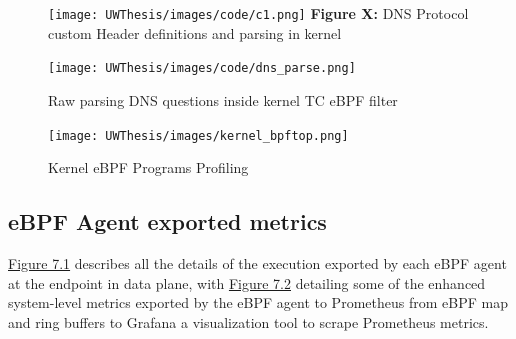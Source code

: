 \documentclass [11pt, proquest] {uwthesis}[2020/02/24]
\begin{document}
\begin{figure}
  \texttt{[image: UWThesis/images/code/c1.png]}
  \newline
  \textbf{Figure X:} DNS Protocol custom Header definitions and parsing in kernel
  \label{fig:c1}
\end{figure}


\begin{figure}[H]
    \centering
    \texttt{[image: UWThesis/images/code/dns\_parse.png]}
    \caption{Raw parsing DNS questions inside kernel TC eBPF filter}
    \label{fig:c2}
\end{figure}

\begin{figure}[H]
    \centering
    \texttt{[image: UWThesis/images/kernel\_bpftop.png]}
    \caption{Kernel eBPF Programs Profiling}
    \label{fig:c3}
\end{figure}


\subsection{eBPF Agent exported metrics}
\hyperref[sec:dp_ebpf_node_metrics]{Figure 7.1} describes all the details of the execution exported by each eBPF agent at the endpoint in data plane, with \hyperref[fig:dns-exfil-packet-metrics]{Figure 7.2} detailing some of the enhanced system-level metrics exported by the eBPF agent to Prometheus from eBPF map and ring buffers to Grafana a visualization tool to scrape Prometheus metrics.
\end{document}
